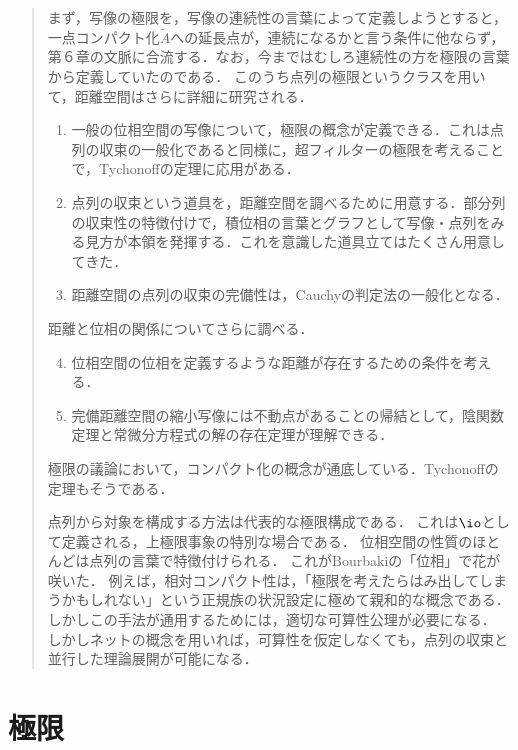 \documentclass[uplatex,dvipdfmx]{jsreport}
\begin{document}
\begin{quotation}
    まず，写像の極限を，写像の連続性の言葉によって定義しようとすると，一点コンパクト化$\widetilde{A}$への延長点が，連続になるかと言う条件に他ならず，第６章の文脈に合流する．なお，今まではむしろ連続性の方を極限の言葉から定義していたのである．
    このうち点列の極限というクラスを用いて，距離空間はさらに詳細に研究される．
    \begin{enumerate}
        \item 一般の位相空間の写像について，極限の概念が定義できる．これは点列の収束の一般化であると同様に，超フィルターの極限を考えることで，Tychonoffの定理に応用がある．
        \item 点列の収束という道具を，距離空間を調べるために用意する．部分列の収束性の特徴付けで，積位相の言葉とグラフとして写像・点列をみる見方が本領を発揮する．これを意識した道具立てはたくさん用意してきた．
        \item 距離空間の点列の収束の完備性は，Cauchyの判定法の一般化となる．
    \end{enumerate}
    距離と位相の関係についてさらに調べる．
    \begin{enumerate}\setcounter{enumi}{3}
        \item 位相空間の位相を定義するような距離が存在するための条件を考える．
        \item 完備距離空間の縮小写像には不動点があることの帰結として，陰関数定理と常微分方程式の解の存在定理が理解できる．
    \end{enumerate}
    極限の議論において，コンパクト化の概念が通底している．Tychonoffの定理もそうである．
    
    点列から対象を構成する方法は代表的な極限構成である．
    これは$\io$として定義される，上極限事象の特別な場合である．
    位相空間の性質のほとんどは点列の言葉で特徴付けられる．
    これがBourbakiの「位相」で花が咲いた．
    例えば，相対コンパクト性は，「極限を考えたらはみ出してしまうかもしれない」という正規族の状況設定に極めて親和的な概念である．
    しかしこの手法が通用するためには，適切な可算性公理が必要になる．
    しかしネットの概念を用いれば，可算性を仮定しなくても，点列の収束と並行した理論展開が可能になる．
\end{quotation}

\section{極限}
\end{document}
